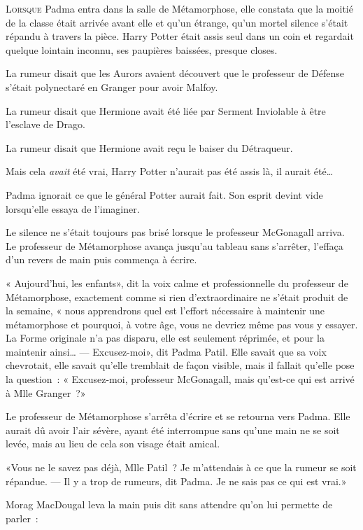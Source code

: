 
\lettrine{L}{orsque}  Padma entra dans la salle de Métamorphose, elle constata que la moitié de la classe était arrivée avant elle et qu'un étrange, qu'un mortel silence s'était répandu à travers la pièce. Harry Potter était assis seul dans un coin et regardait quelque lointain inconnu, ses paupières baissées, presque closes.

La rumeur disait que les Aurors avaient découvert que le professeur de Défense s'était polynectaré en Granger pour avoir Malfoy.

La rumeur disait que Hermione avait été liée par Serment Inviolable à être l'esclave de Drago.

La rumeur disait que Hermione avait reçu le baiser du Détraqueur.

Mais cela \emph{avait} été vrai, Harry Potter n'aurait pas été assis là, il aurait été…

Padma ignorait ce que le général Potter aurait fait. Son esprit devint vide lorsqu'elle essaya de l'imaginer.

Le silence ne s'était toujours pas brisé lorsque le professeur McGonagall arriva. Le professeur de Métamorphose avança jusqu'au tableau sans s'arrêter, l'effaça d'un revers de main puis commença à écrire.

« Aujourd'hui, les enfants», dit la voix calme et professionnelle du professeur de Métamorphose, exactement comme si rien d'extraordinaire ne s'était produit de la semaine, « nous apprendrons quel est l'effort nécessaire à maintenir une métamorphose et pourquoi, à votre âge, vous ne devriez même pas vous y essayer. La Forme originale n'a pas disparu, elle est seulement réprimée, et pour la maintenir ainsi…
---  Excusez-moi», dit Padma Patil. Elle savait que sa voix chevrotait, elle savait qu'elle tremblait de façon visible, mais il fallait qu'elle pose la question~: « Excusez-moi, professeur McGonagall, mais qu'est-ce qui est arrivé à Mlle Granger~?»

Le professeur de Métamorphose s'arrêta d'écrire et se retourna vers Padma. Elle aurait dû avoir l'air sévère, ayant été interrompue sans qu'une main ne se soit levée, mais au lieu de cela son visage était amical.

«Vous ne le savez pas déjà, Mlle Patil~? Je m'attendais à ce que la rumeur se soit répandue.
---  Il y a trop de rumeurs, dit Padma. Je ne sais pas ce qui est vrai.»

Morag MacDougal leva la main puis dit sans attendre qu'on lui permette de parler~:

